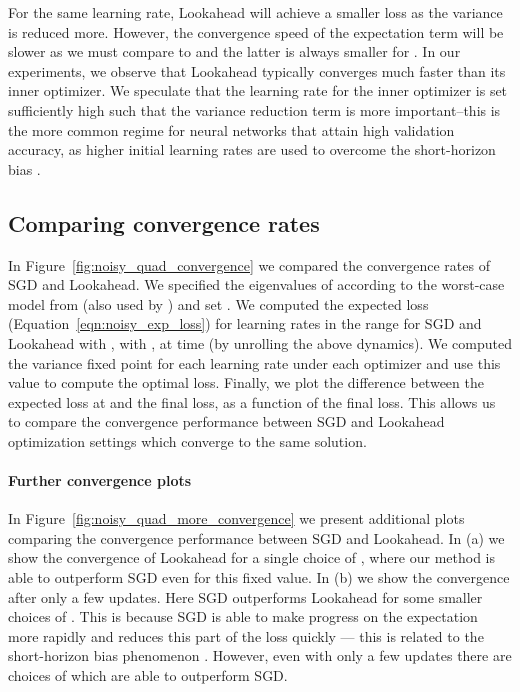 \documentclass{article}
\begin{document}
For the same learning rate, Lookahead will achieve a smaller loss as the variance is reduced more. However, the convergence speed of the expectation term will be slower as we must compare  to  and the latter is always smaller for . In our experiments, we observe that Lookahead typically converges much faster than its inner optimizer. We speculate that the learning rate for the inner optimizer is set sufficiently high such that the variance reduction term is more important--this is the more common regime for neural networks that attain high validation accuracy, as higher initial learning rates are used to overcome the short-horizon bias \citep{wu2018understanding}.

\subsection{Comparing convergence rates} In Figure~\ref{fig:noisy_quad_convergence} we compared the convergence rates of SGD and Lookahead. We specified the eigenvalues of  according to the worst-case model from \citet{li2005sharpness} (also used by \citet{wu2018understanding}) and set . We computed the expected loss (Equation~\ref{eqn:noisy_exp_loss}) for learning rates in the range  for SGD and Lookahead with , with , at time  (by unrolling the above dynamics). We computed the variance fixed point for each learning rate under each optimizer and use this value to compute the optimal loss. Finally, we plot the difference between the expected loss at  and the final loss, as a function of the final loss. This allows us to compare the convergence performance between SGD and Lookahead optimization settings which converge to the same solution.

\paragraph{Further convergence plots} In Figure~\ref{fig:noisy_quad_more_convergence} we present additional plots comparing the convergence performance between SGD and Lookahead. In (a) we show the convergence of Lookahead for a single choice of , where our method is able to outperform SGD even for this fixed value. In (b) we show the convergence after only a few updates. Here SGD outperforms Lookahead for some smaller choices of .  This is because SGD is able to make progress on the expectation more rapidly and reduces this part of the loss quickly --- this is related to the short-horizon bias phenomenon \citep{wu2018understanding}. However, even with only a few updates there are choices of  which are able to outperform SGD.
\end{document}
